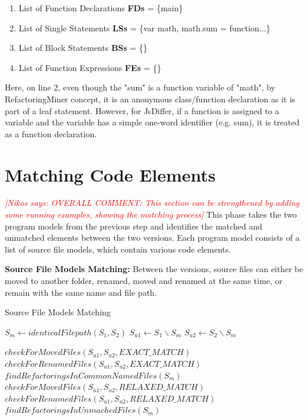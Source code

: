 \documentclass[letterpaper,12pt,onecolumn,final]{report}
\newcommand{\nikos}[1]{\textcolor{red}{{\it [Nikos says: #1]}}}
\begin{document}
\begin{enumerate}
\item List of Function Declarations \textbf{FDs} = \{main\}
\item List of Single Statements \textbf{LSs} = \{var math, math.sum = function...\}
\item List of Block Statements \textbf{BSs} = \{\}
\item List of Function Expressions \textbf{FEs} = \{\}
\end{enumerate}

Here, on line 2, even though the "sum" is a function variable of "math", by RefactoringMiner concept, it is an anonymous class/function declaration as it is part of a leaf statement. However, for JsDiffer, if a function is assigned to a variable and the variable has a simple one-word identifier (e.g. sum), it is treated as a function declaration.

\section {Matching Code Elements}
\nikos{OVERALL COMMENT: This section can be strengthened by adding some running examples, showing the matching process}
This phase takes the two program models from the previous step and identifies the matched and unmatched elements between the two versions. Each program model consists of a list of source file models, which contain various code elements.

\textbf{Source File Models Matching:} 
Between the versions, source files can either be moved to another folder, renamed, moved and renamed at the same time, or remain with the same name and file path.
\begin{algorithm}
\DontPrintSemicolon
\caption{Source File Models Matching}\label{alg:algo1}
\label{alg:sourceFileMatchingAlgo}


$S_{m} \gets identicalFilepath(S_{1}, S_{2})$\; \label{lst:line:commonNamedFiles}
$S_{u1} \gets S_{1} \backslash S_{m}$\;
$S_{u2} \gets S_{2} \backslash S_{m}$\;

$checkForMovedFiles(S_{u1}, S_{u2}, EXACT\_MATCH)$\;
$checkForRenamedFiles(S_{u1}, S_{u2}, EXACT\_MATCH)$\;
$findRefactoringsInCommonNamedFiles(S_{m})$\;
$checkForMovedFiles(S_{u1}, S_{u2}, RELAXED\_MATCH)$\;
$checkForRenamedFiles(S_{u1}, S_{u2}, RELAXED\_MATCH)$\;
$findRefactoringsInUnmachedFiles(S_{m})$\;
\end{algorithm}
\end{document}
